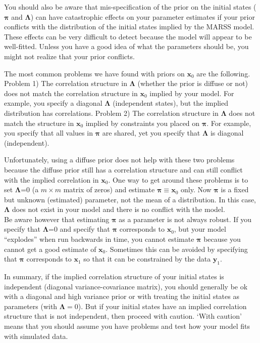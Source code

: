 \documentclass[12pt,]{book}
\begin{document}
You should also be aware that mis-specification of the prior on the initial states (\(\boldsymbol{\pi}\) and \(\boldsymbol{\Lambda}\)) can have catastrophic effects on your parameter estimates if your prior conflicts with the distribution of the initial states implied by the MARSS model. These effects can be very difficult to detect because the model will appear to be well-fitted. Unless you have a good idea of what the parameters should be, you might not realize that your prior conflicts.

The most common problems we have found with priors on \(\mathbf{x}_0\) are the following. Problem 1) The correlation structure in \(\boldsymbol{\Lambda}\) (whether the prior is diffuse or not) does not match the correlation structure in \(\mathbf{x}_0\) implied by your model. For example, you specify a diagonal \(\boldsymbol{\Lambda}\) (independent states), but the implied distribution has correlations. Problem 2) The correlation structure in \(\boldsymbol{\Lambda}\) does not match the structure in \(\mathbf{x}_0\) implied by constraints you placed on \(\boldsymbol{\pi}\). For example, you specify that all values in \(\boldsymbol{\pi}\) are shared, yet you specify that \(\boldsymbol{\Lambda}\) is diagonal (independent).

Unfortunately, using a diffuse prior does not help with these two problems because the diffuse prior still has a correlation structure and can still conflict with the implied correlation in \(\mathbf{x}_0\). One way to get around these problems is to set \(\boldsymbol{\Lambda}\)=0 (a \(m \times m\) matrix of zeros) and estimate \(\boldsymbol{\pi} \equiv \mathbf{x}_0\) only. Now \(\boldsymbol{\pi}\) is a fixed but unknown (estimated) parameter, not the mean of a distribution. In this case, \(\boldsymbol{\Lambda}\) does not exist in your model and there is no conflict with the model.\\
Be aware however that estimating \(\boldsymbol{\pi}\) as a parameter is not always robust. If you specify that \(\boldsymbol{\Lambda}\)=0 and specify that \(\boldsymbol{\pi}\) corresponds to \(\mathbf{x}_0\), but your model ``explodes'' when run backwards in time, you cannot estimate \(\boldsymbol{\pi}\) because you cannot get a good estimate of \(\mathbf{x}_0\). Sometimes this can be avoided by specifying that \(\boldsymbol{\pi}\) corresponds to \(\mathbf{x}_1\) so that it can be constrained by the data \(\mathbf{y}_1\).

In summary, if the implied correlation structure of your initial states is independent (diagonal variance-covariance matrix), you should generally be ok with a diagonal and high variance prior or with treating the initial states as parameters (with \(\boldsymbol{\Lambda}=0\)). But if your initial states have an implied correlation structure that is not independent, then proceed with caution. `With caution' means that you should assume you have problems and test how your model fits with simulated data.
\end{document}
